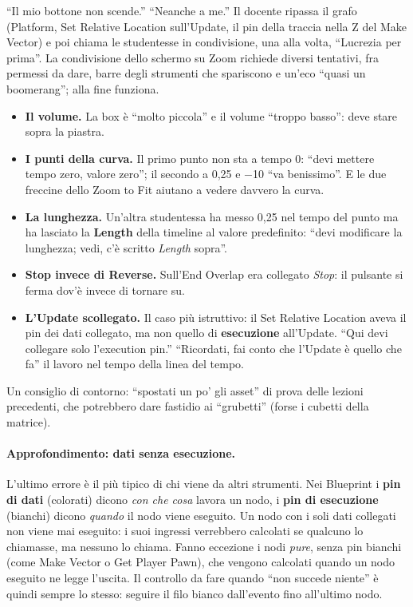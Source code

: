 ``Il mio bottone non scende.'' ``Neanche a me.'' Il docente ripassa il grafo (Platform,
Set Relative Location sull'Update, il pin della traccia nella Z del Make Vector) e poi
chiama le studentesse in condivisione, una alla volta, ``Lucrezia per prima''. La
condivisione dello schermo su Zoom richiede diversi tentativi, fra permessi da dare,
barre degli strumenti che spariscono e un'eco ``quasi un boomerang''; alla fine
funziona.
\begin{itemize}
  \item \textbf{Il volume.} La box è ``molto piccola'' e il volume ``troppo basso'': deve
        stare sopra la piastra.
  \item \textbf{I punti della curva.} Il primo punto non sta a tempo 0: ``devi mettere
        tempo zero, valore zero''; il secondo a 0,25 e $-$10 ``va benissimo''. E le due
        freccine dello Zoom to Fit aiutano a vedere davvero la curva.
  \item \textbf{La lunghezza.} Un'altra studentessa ha messo 0,25 nel tempo del punto ma
        ha lasciato la \textbf{Length} della timeline al valore predefinito: ``devi
        modificare la lunghezza; vedi, c'è scritto \emph{Length} sopra''.
  \item \textbf{Stop invece di Reverse.} Sull'End Overlap era collegato \emph{Stop}: il
        pulsante si ferma dov'è invece di tornare su.
  \item \textbf{L'Update scollegato.} Il caso più istruttivo: il Set Relative Location
        aveva il pin dei dati collegato, ma non quello di \textbf{esecuzione}
        all'Update. ``Qui devi collegare solo l'execution pin.'' ``Ricordati, fai conto
        che l'Update è quello che fa'' il lavoro nel tempo della linea del tempo.
\end{itemize}
Un consiglio di contorno: ``spostati un po' gli asset'' di prova delle lezioni
precedenti, che potrebbero dare fastidio ai ``grubetti'' (forse i cubetti della
matrice).

\paragraph{Approfondimento: dati senza esecuzione.} L'ultimo errore è il più tipico di chi
viene da altri strumenti. Nei Blueprint i \textbf{pin di dati} (colorati) dicono
\emph{con che cosa} lavora un nodo, i \textbf{pin di esecuzione} (bianchi) dicono
\emph{quando} il nodo viene eseguito. Un nodo con i soli dati collegati non viene mai
eseguito: i suoi ingressi verrebbero calcolati se qualcuno lo chiamasse, ma nessuno lo
chiama. Fanno eccezione i nodi \emph{pure}, senza pin bianchi (come Make Vector o
Get Player Pawn), che vengono calcolati quando un nodo eseguito ne legge l'uscita. Il
controllo da fare quando ``non succede niente'' è quindi sempre lo stesso: seguire il
filo bianco dall'evento fino all'ultimo nodo.


